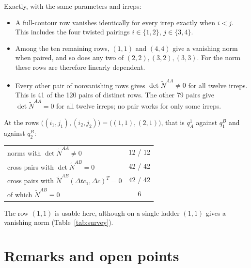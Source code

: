 \documentclass[11pt]{article}
\begin{document}
Exactly, with the same parameters and irreps:
\begin{itemize}
\item A full-contour row vanishes identically for every irrep exactly when $i<j$. This includes
the four twisted pairings $i\in\{1,2\}$, $j\in\{3,4\}$.
\item Among the ten remaining rows, $(1,1)$ and $(4,4)$ give a vanishing norm when paired, and so
does any two of $(2,2),(3,2),(3,3)$. For the norm these rows are therefore linearly dependent.
\item Every other pair of nonvanishing rows gives $\det\tilde N^{AA}\neq0$ for all twelve irreps.
This is 41 of the 120 pairs of distinct rows. The other 79 pairs give $\det\tilde N^{AA}=0$ for all
twelve irreps; no pair works for only some irreps.
\end{itemize}
At the rows $\big((i_1,j_1),(i_2,j_2)\big)=\big((1,1),(2,1)\big)$, that is $q^1_A$ against $q^B_1$
and against $q^B_2$:

\begin{center}
\begin{tabular}{lc}
\toprule
norms with $\det\tilde N^{AA}\neq0$ & 12 / 12\\
cross pairs with $\det\tilde N^{AB}=0$ & 42 / 42\\
cross pairs with $\tilde N^{AB}(\Delta tc_1,\Delta c)^T=0$ & 42 / 42\\
\quad of which $\tilde N^{AB}\equiv0$ & 6\\
\bottomrule
\end{tabular}
\end{center}

The row $(1,1)$ is usable here, although on a single ladder $(1,1)$ gives a vanishing norm
(Table~\ref{tab:survey}).

\section{Remarks and open points}
\end{document}
